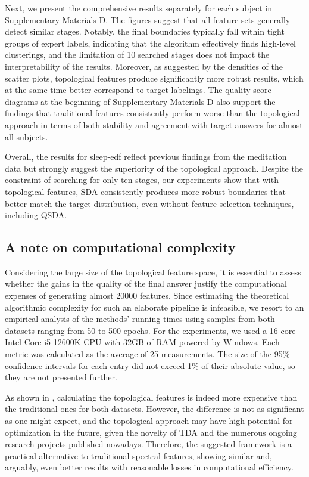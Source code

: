 \documentclass[10pt]{iopart}
\begin{document}
Next, we present the comprehensive results separately for each subject in Supplementary Materials D. The figures suggest that all feature sets generally detect similar stages. Notably, the final boundaries typically fall within tight groups of expert labels, indicating that the algorithm effectively finds high-level clusterings, and the limitation of 10 searched stages does not impact the interpretability of the results. Moreover, as suggested by the densities of the scatter plots, topological features produce significantly more robust results, which at the same time better correspond to target labelings. The quality score diagrams at the beginning of Supplementary Materials D also support the findings that traditional features consistently perform worse than the topological approach in terms of both stability and agreement with target answers for almost all subjects.

Overall, the results for sleep-edf reflect previous findings from the meditation data but strongly suggest the superiority of the topological approach. Despite the constraint of searching for only ten stages, our experiments show that with topological features, SDA consistently produces more robust boundaries that better match the target distribution, even without feature selection techniques, including QSDA.\@

\subsection{A note on computational complexity}

Considering the large size of the topological feature space, it is essential to assess whether the gains in the quality of the final answer justify the computational expenses of generating almost 20000 features. Since estimating the theoretical algorithmic complexity for such an elaborate pipeline is infeasible, we resort to an empirical analysis of the methods' running times using samples from both datasets ranging from 50 to 500 epochs. For the experiments, we used a 16-core Intel Core i5-12600K CPU with 32GB of RAM powered by Windows. Each metric was calculated as the average of 25 measurements. The size of the 95\% confidence intervals for each entry did not exceed 1\% of their absolute value, so they are not presented further.

As shown in , calculating the topological features is indeed more expensive than the traditional ones for both datasets. However, the difference is not as significant as one might expect, and the topological approach may have high potential for optimization in the future, given the novelty of TDA and the numerous ongoing research projects published nowadays. Therefore, the suggested framework is a practical alternative to traditional spectral features, showing similar and, arguably, even better results with reasonable losses in computational efficiency.
\end{document}
